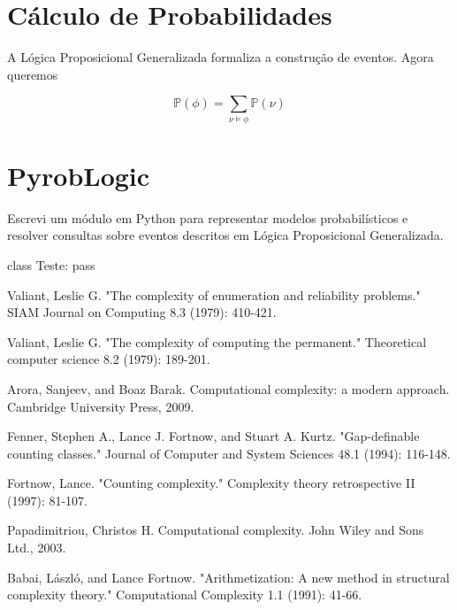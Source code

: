 \documentclass[paper=a4, fontsize=11pt]{scrartcl} %
\numberwithin{equation}{subsection}
\numberwithin{figure}{subsection}
\numberwithin{table}{subsection}
\numberwithin{definition}{subsection}
\numberwithin{theorem}{subsection}
\numberwithin{property}{subsection}
\numberwithin{proposition}{subsection}
\numberwithin{equation}{section}
\numberwithin{figure}{section}
\numberwithin{table}{section}
\numberwithin{definition}{section}
\numberwithin{theorem}{section}
\numberwithin{property}{section}
\numberwithin{proposition}{section}
\renewcommand{\P}{\mathbb{P}}
\begin{document}
\section{Cálculo de Probabilidades}

A Lógica Proposicional Generalizada formaliza a construção de eventos. Agora queremos 

$$
  \P(\phi) = \sum_{\nu \models \phi} \P(\nu)
$$

\section{PyrobLogic}

Escrevi um módulo em Python para representar modelos probabilísticos e resolver consultas sobre eventos descritos em Lógica Proposicional Generalizada.   


\begin{python}
class Teste:
    pass
\end{python}


\begin{thebibliography}{1}

 Valiant, Leslie G. "The complexity of enumeration and reliability problems." SIAM Journal on Computing 8.3 (1979): 410-421.

 Valiant, Leslie G. "The complexity of computing the permanent." Theoretical computer science 8.2 (1979): 189-201.

 Arora, Sanjeev, and Boaz Barak. Computational complexity: a modern approach. Cambridge University Press, 2009.

 Fenner, Stephen A., Lance J. Fortnow, and Stuart A. Kurtz. "Gap-definable counting classes." Journal of Computer and System Sciences 48.1 (1994): 116-148.

 Fortnow, Lance. "Counting complexity." Complexity theory retrospective II (1997): 81-107.

 Papadimitriou, Christos H. Computational complexity. John Wiley and Sons Ltd., 2003.

 Babai, László, and Lance Fortnow. "Arithmetization: A new method in structural complexity theory." Computational Complexity 1.1 (1991): 41-66.

\end{thebibliography}
\end{document}
